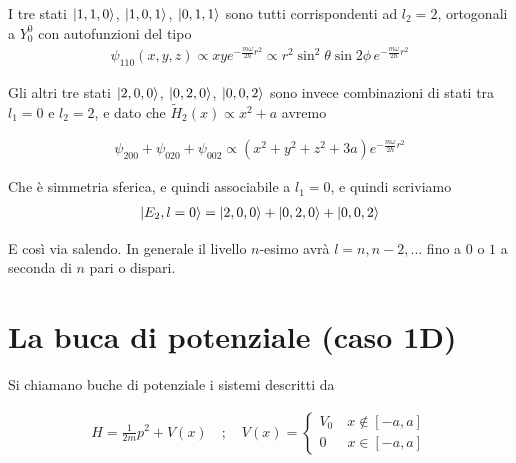 \begin{enumerate}
\begin{enumerate}
		I tre stati $\ket{1,1,0}$, $\ket{1,0,1}$, $\ket{0,1,1}$ sono tutti corrispondenti ad $l_2=2$, ortogonali a $Y^0_0$ con autofunzioni del tipo
		\begin{align}
		\psi_{110}(x,y,z)\propto xy e^{-\frac{m\omega}{2\hbar}r^2} \propto r^2 \sin^2{\theta} \sin{2\phi} \,e^{-\frac{m\omega}{2\hbar}r^2} \nonumber
		\end{align}
		
		Gli altri tre stati $\ket{2,0,0}$, $\ket{0,2,0}$, $\ket{0,0,2}$ sono invece combinazioni di stati tra $l_1=0$ e $l_2=2$, e dato che $\tilde{H}_2(x) \propto x^2 + a$ avremo
		
		\begin{align}
		\psi_{200} + \psi_{020} + \psi_{002} \propto (x^2 + y^2 + z^2 + 3a)e^{-\frac{m\omega}{2\hbar}r^2} \nonumber
		\end{align}
		
		Che è simmetria sferica, e quindi associabile a $l_1=0$, e quindi scriviamo
		\begin{align}
		\ket{E_2, l=0}= \ket{2,0,0} + \ket{0,2,0} + \ket{0,0,2} \nonumber
		\end{align}
		\end{enumerate}
\end{enumerate}

E così via salendo. In generale il livello $n$-esimo avrà $l=n,n-2,...$ fino a $0$ o $1$ a seconda di $n$ pari o dispari.
 
\newpage

\section{La buca di potenziale (caso 1D)}

 Si chiamano buche di potenziale i sistemi descritti da
 
 \begin{align}
  H= \frac{1}{2m} p^2 + V(x) \quad;\quad V(x)= \left\{
  \begin{array}{cc}
V_0 \quad x \notin [-a,a]\\
0 \quad \;\: x \in [-a,a]
 \end{array}
  \right.
 \end{align}
 
  \begin{figure}[!htb]
  \end{figure}
 
